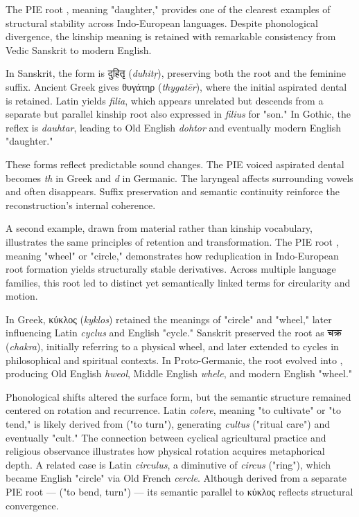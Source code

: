 The PIE root , meaning "daughter," provides one of the clearest examples of structural stability across Indo-European languages. Despite phonological divergence, the kinship meaning is retained with remarkable consistency from Vedic Sanskrit to modern English.

In Sanskrit, the form is \textsanskrit{दुहितृ} (\emph{duhitṛ}), preserving both the root and the feminine suffix. Ancient Greek gives \textgreek{θυγάτηρ} (\emph{thygatēr}), where the initial aspirated dental is retained. Latin yields \emph{filia}, which appears unrelated but descends from a separate but parallel kinship root also expressed in \emph{filius} for "son." In Gothic, the reflex is \emph{dauhtar}, leading to Old English \emph{dohtor} and eventually modern English "daughter."

These forms reflect predictable sound changes. The PIE voiced aspirated dental  becomes \emph{th} in Greek and \emph{d} in Germanic. The laryngeal  affects surrounding vowels and often disappears. Suffix preservation and semantic continuity reinforce the reconstruction's internal coherence.

A second example, drawn from material rather than kinship vocabulary, illustrates the same principles of retention and transformation. The PIE root , meaning "wheel" or "circle," demonstrates how reduplication in Indo-European root formation yields structurally stable derivatives. Across multiple language families, this root led to distinct yet semantically linked terms for circularity and motion.

In Greek, \textgreek{κύκλος} (\emph{kyklos}) retained the meanings of "circle" and "wheel," later influencing Latin \emph{cyclus} and English "cycle." Sanskrit preserved the root as \textsanskrit{चक्र} (\emph{chakra}), initially referring to a physical wheel, and later extended to cycles in philosophical and spiritual contexts. In Proto-Germanic, the root evolved into , producing Old English \emph{hweol}, Middle English \emph{whele}, and modern English "wheel."

Phonological shifts altered the surface form, but the semantic structure remained centered on rotation and recurrence. Latin \emph{colere}, meaning "to cultivate" or "to tend," is likely derived from  ("to turn"), generating \emph{cultus} ("ritual care") and eventually "cult." The connection between cyclical agricultural practice and religious observance illustrates how physical rotation acquires metaphorical depth. A related case is Latin \emph{circulus}, a diminutive of \emph{circus} ("ring"), which became English "circle" via Old French \emph{cercle}. Although derived from a separate PIE root —  ("to bend, turn") — its semantic parallel to \textgreek{κύκλος} reflects structural convergence.

